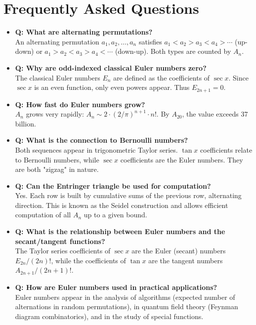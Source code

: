 \section{Frequently Asked Questions}

\begin{itemize}
\item \textbf{Q: What are alternating permutations?} \\
An alternating permutation $a_1, a_2, \ldots, a_n$ satisfies $a_1 < a_2 > a_3 < a_4 > \cdots$
(up-down) or $a_1 > a_2 < a_3 > a_4 < \cdots$ (down-up). Both types are counted by $A_n$.

\item \textbf{Q: Why are odd-indexed classical Euler numbers zero?} \\
The classical Euler numbers $E_n$ are defined as the coefficients of $\sec x$. Since $\sec x$ is an even function, only even powers appear. Thus $E_{2n+1} = 0$.

\item \textbf{Q: How fast do Euler numbers grow?} \\
$A_n$ grows very rapidly: $A_n \sim 2 \cdot (2/\pi)^{n+1} \cdot n!$. By $A_{20}$, the value exceeds 37 billion.

\item \textbf{Q: What is the connection to Bernoulli numbers?} \\
Both sequences appear in trigonometric Taylor series. $\tan x$ coefficients relate to Bernoulli numbers, while $\sec x$ coefficients are the Euler numbers. They are both "zigzag" in nature.

\item \textbf{Q: Can the Entringer triangle be used for computation?} \\
Yes. Each row is built by cumulative sums of the previous row, alternating direction. This is known as the Seidel construction and allows efficient computation of all $A_n$ up to a given bound.

\item \textbf{Q: What is the relationship between Euler numbers and the secant/tangent functions?} \\
The Taylor series coefficients of $\sec x$ are the Euler (secant) numbers $E_{2n}/(2n)!$, while the coefficients of $\tan x$ are the tangent numbers $A_{2n+1}/(2n+1)!$.

\item \textbf{Q: How are Euler numbers used in practical applications?} \\
Euler numbers appear in the analysis of algorithms (expected number of alternations in random permutations), in quantum field theory (Feynman diagram combinatorics), and in the study of special functions.


\end{itemize}
